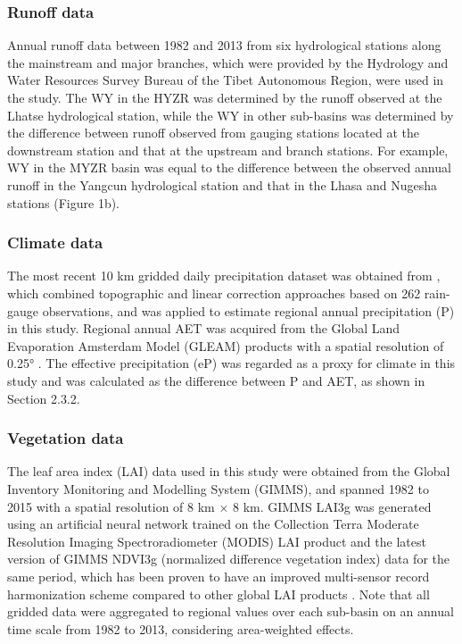 \documentclass[hess, manuscript]{copernicus}
\begin{document}
\subsubsection{Runoff data}
Annual runoff data between 1982 and 2013 from six hydrological stations along the mainstream and major branches, which were provided by the Hydrology and Water Resources Survey Bureau of the Tibet Autonomous Region, were used in the study. The WY in the HYZR was determined by the runoff observed at the Lhatse hydrological station, while the WY in other sub-basins was determined by the difference between runoff observed from gauging stations located at the downstream station and that at the upstream and branch stations. For example, WY in the MYZR basin was equal to the difference between the observed annual runoff in the Yangcun hydrological station and that in the Lhasa and Nugesha stations (Figure 1b).

\subsubsection{Climate data}
The most recent 10 km gridded daily precipitation dataset was obtained from \citet{sun2020precipitation}, which combined topographic and linear correction approaches based on 262 rain-gauge observations, and was applied to estimate regional annual precipitation (P) in this study. Regional annual AET was acquired from the Global Land Evaporation Amsterdam Model (GLEAM) products with a spatial resolution of 0.25° 
\citep{martens2017gleam}. The effective precipitation (eP) was regarded as a proxy for climate in this study and was calculated as the difference between P and AET, as shown in Section 2.3.2.

\subsubsection{Vegetation data}
The leaf area index (LAI) data used in this study were obtained from the Global Inventory Monitoring and Modelling System (GIMMS), and spanned 1982 to 2015 with a spatial resolution of 8 km × 8 km. GIMMS LAI3g \citep{zhu2013global} was generated using an artificial neural network trained on the Collection Terra Moderate Resolution Imaging Spectroradiometer (MODIS) LAI product and the latest version of GIMMS NDVI3g (normalized difference vegetation index) data for the same period, which has been proven to have an improved multi-sensor record harmonization scheme compared to other global LAI products \citep{forzieri2020increased,gonsamo2021greening}. Note that all gridded data were aggregated to regional values over each sub-basin on an annual time scale from 1982 to 2013, considering area-weighted effects.
\end{document}
